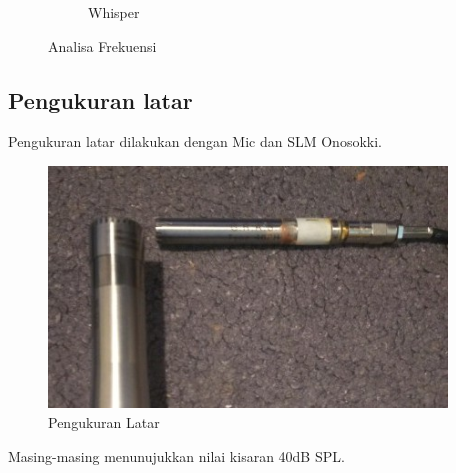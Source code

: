 \documentclass[12pt,]{article}
\begin{document}
\begin{figure}[!ht]
\begin{subfigure}[b]{0.25\textwidth}
			\caption{Whisper}
		\end{subfigure}
		\caption{Analisa Frekuensi}
	\end{figure}

	\subsection{Pengukuran latar}
	
	Pengukuran latar dilakukan dengan Mic dan SLM Onosokki.
	
	\begin{figure}[!ht]
		\centering
		\includegraphics[width=300pt]{images/ni_noise}
		\caption{Pengukuran Latar}
	\end{figure}

	\newpage
	Masing-masing menunujukkan nilai kisaran 40dB SPL.
	
\end{document}
